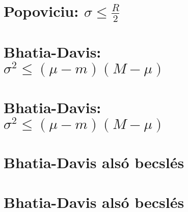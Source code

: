 \begin{spacing}{1.4}
\section*{Popoviciu: $\sigma\le\frac{R}{2}$} \label{DBuno3Mo}
\Mo{

}
\vspace{0.5cm}
\newpage
\section*{Bhatia-Davis: $\sigma^2\le (\mu-m)(M-\mu)$} \label{DBuno4}
\Fa{

}
\vspace{0.5cm}
\newpage
\section*{Bhatia-Davis: $\sigma^2\le (\mu-m)(M-\mu)$} \label{DBuno4Mo}
\Mo{

}
\vspace{0.5cm}
\newpage
\section*{Bhatia-Davis alsó becslés} \label{DBuno5}
\Fa{

}
\vspace{0.5cm}
\newpage
\section*{Bhatia-Davis alsó becslés} \label{DBuno5Mo}
\Mo{

}
\vspace{0.5cm}
\newpage

\end{spacing}


